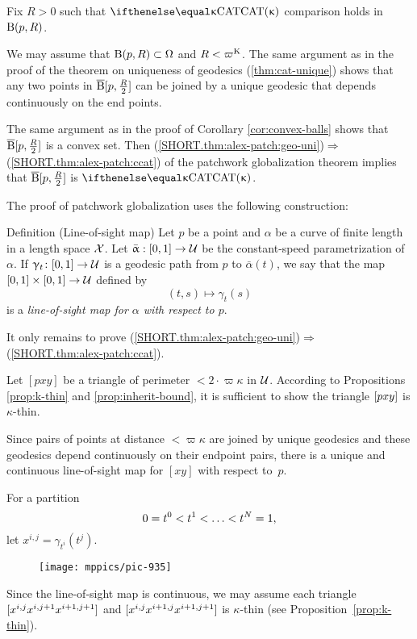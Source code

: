 Fix $R>0$ such that $\CAT\kappa$ comparison holds in $\mathrm{B}{}(p,R)$.

We may assume that $\oBall(p,R)\subset\Omega$ and $R<\varpi\Kappa$.
The same argument as in the proof of the theorem on uniqueness of geodesics (\ref{thm:cat-unique}) 
shows that any two points in $\overline{\mathrm{B}}{}[p,\tfrac R2]$ can be joined by a unique geodesic that depends continuously on the end points.

The same argument as in the proof of Corollary \ref{cor:convex-balls} shows that $\overline{\mathrm{B}}{}[p,\tfrac R2]$ is a convex set.
Then (\ref{SHORT.thm:alex-patch:geo-uni})$\Rightarrow$(\ref{SHORT.thm:alex-patch:ccat})  of the patchwork globalization theorem implies that $\overline{\mathrm{B}}{}[p,\tfrac R2]$ is $\CAT\kappa$.
\qeds

The proof of patchwork globalization uses the following construction:

\begin{thm}{Definition (Line-of-sight map)} \label{def:sight}
Let  $p$ be a point and $\alpha$ be a curve of finite length in  a length space $\mathcal{X}$. 
Let $\bar\alpha:[0,1]\to\spc{U}$ be the constant-speed parametrization of $\alpha$.
If $\gamma_t\:[0,1]\to\spc{U}$ is a geodesic path from $p$ to $\bar\alpha(t)$, we say that the map $[0,1]\times[0,1]\to\spc{U}$ defined by
\[(t,s)\mapsto\gamma_t(s)\]
is a \emph{line-of-sight map for $\alpha$ with respect to $p$}.
\end{thm}

 It only remains to prove (\ref{SHORT.thm:alex-patch:geo-uni})$\Rightarrow$(\ref{SHORT.thm:alex-patch:ccat}).

Let $[p x y]$ be a triangle of perimeter $<2\cdot\varpi\kappa$  in $\mathcal{U}$. 
According to Propositions \ref{prop:k-thin} and \ref{prop:inherit-bound}, it is sufficient to show the triangle $[{p}{x}{y}]$ is $\kappa$-thin.

Since pairs of points at distance $<\varpi\kappa$ are joined by unique geodesics and these geodesics depend continuously on their endpoint pairs, there is a unique and continuous line-of-sight map for  $[x y]$ with respect to~$p$.    

For a partition \[0\z=t^0\z<t^1\z<\z\dots\z<t^N=1,\] 
let $x^{i,j}=\gamma_{t^i}(t^j)$. 
\begin{figure}[!ht]
\vskip0mm
\centering
\texttt{[image: mppics/pic-935]}
\end{figure}
Since the line-of-sight map is continuous, we may assume each triangle $[{x^{i,j}}{x^{i,j+1}}{x^{i+1,j+1}}]$ and $[{x^{i,j}}{x^{i+1,j}}{x^{i+1,j+1}}]$ is $\kappa$-thin 
(see Proposition~\ref{prop:k-thin}).

